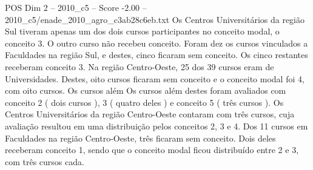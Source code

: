 \begin{textsample}{POS Dim 2 – 2010\_c5 – Score -2.00 – 2010\_c5/enade\_2010\_agro\_c3ab28c6eb.txt}
Os Centros Universitários da região Sul tiveram apenas um dos dois cursos participantes no conceito modal, o conceito 3.
O outro curso não recebeu conceito.
Foram dez os cursos vinculados a Faculdades na região Sul, e destes, cinco ficaram sem conceito.
Os cinco restantes receberam conceito 3.
Na região Centro-Oeste, 25 dos 39 cursos eram de Universidades.
Destes, oito cursos ficaram sem conceito e o conceito modal foi 4, com oito cursos.
Os cursos além Os cursos além destes foram avaliados com conceito 2 ( dois cursos ), 3 ( quatro deles ) e conceito 5 ( três cursos ).
Os Centros Universitários da região Centro-Oeste contaram com três cursos, cuja avaliação resultou em uma distribuição pelos conceitos 2, 3 e 4.
Dos 11 cursos em Faculdades na região Centro-Oeste, três ficaram sem conceito.
Dois deles receberam conceito 1, sendo que o conceito modal ficou distribuído entre 2 e 3, com três cursos cada.

\end{textsample}
